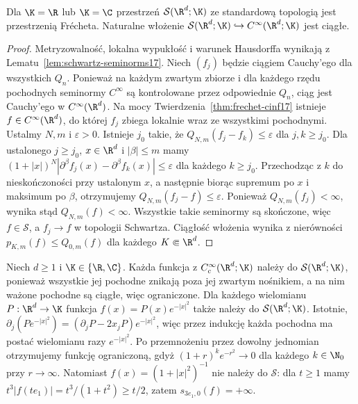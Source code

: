\begin{twierdzenie}
\label{thm:schwartz-frechet17}
Dla $\K=\R$ lub $\K=\C$ przestrzeń $\mathcal S(\R^d;\K)$
ze standardową topologią jest przestrzenią Frécheta.
Naturalne włożenie $\mathcal S(\R^d;\K)\hookrightarrow
C^\infty(\R^d;\K)$ jest ciągłe.
\end{twierdzenie}
\begin{proof}
Metryzowalność, lokalna wypukłość i warunek Hausdorffa wynikają z
Lematu~\ref{lem:schwartz-seminorms17}.
Niech $(f_j)$ będzie ciągiem Cauchy'ego dla wszystkich $Q_n$.
Ponieważ na każdym zwartym zbiorze i dla każdego rzędu pochodnych
seminormy $C^\infty$ są kontrolowane przez odpowiednie $Q_n$,
ciąg jest Cauchy'ego w $C^\infty(\R^d)$.
Na mocy Twierdzenia~\ref{thm:frechet-cinf17} istnieje
$f\in C^\infty(\R^d)$, do której $f_j$ zbiega lokalnie
wraz ze wszystkimi pochodnymi.
Ustalmy $N,m$ i $\varepsilon>0$. Istnieje $j_0$ takie, że
$Q_{N,m}(f_j-f_k)\le\varepsilon$ dla $j,k\ge j_0$.
Dla ustalonego $j\ge j_0$, $x\in\R^d$ i $|\beta|\le m$
mamy $(1+|x|)^N|\partial^\beta f_j(x)-\partial^\beta f_k(x)|
\le\varepsilon$ dla każdego $k\ge j_0$.
Przechodząc z $k$ do nieskończoności przy ustalonym $x$,
a następnie biorąc supremum po $x$ i maksimum po $\beta$,
otrzymujemy $Q_{N,m}(f_j-f)\le\varepsilon$.
Ponieważ $Q_{N,m}(f_j)<\infty$, wynika stąd
$Q_{N,m}(f)<\infty$. Wszystkie takie seminormy są skończone,
więc $f\in\mathcal S$, a $f_j\to f$ w topologii Schwartza.
Ciągłość włożenia wynika z nierówności
$p_{K,m}(f)\le Q_{0,m}(f)$ dla każdego $K\Subset\R^d$.
\end{proof}

\begin{przyklad}
\label{ex:schwartz-functions17}
Niech $d\ge1$ i $\K\in\{\R,\C\}$.
Każda funkcja z $C_c^\infty(\R^d;\K)$ należy do
$\mathcal S(\R^d;\K)$, ponieważ wszystkie jej pochodne
znikają poza jej zwartym nośnikiem, a na nim
ważone pochodne są ciągłe, więc ograniczone.
Dla każdego wielomianu $P:\R^d\to\K$ funkcja
$f(x)=P(x)e^{-|x|^2}$ także należy do $\mathcal S(\R^d;\K)$.
Istotnie, $\partial_j(Pe^{-|x|^2})=
(\partial_jP-2x_jP)e^{-|x|^2}$, więc przez indukcję
każda pochodna ma postać wielomianu razy $e^{-|x|^2}$.
Po przemnożeniu przez dowolny jednomian otrzymujemy
funkcję ograniczoną, gdyż $(1+r)^k e^{-r^2}\to0$
dla każdego $k\in\N_0$ przy $r\to\infty$.
Natomiast $f(x)=(1+|x|^2)^{-1}$ nie należy do $\mathcal S$:
dla $t\ge1$ mamy $t^3|f(te_1)|=t^3/(1+t^2)\ge t/2$,
zatem $s_{3e_1,0}(f)=+\infty$.
\end{przyklad}

